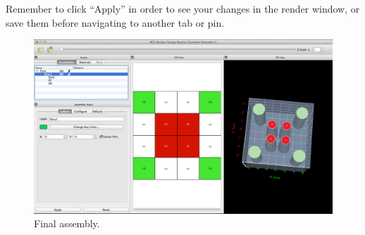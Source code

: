 Remember to click ``Apply'' in order to see your changes in the render window, or save them before navigating to another tab or pin.

\begin{figure}[htb]
\begin{center}
\includegraphics[width=0.7\linewidth]{Images/rect-final-assy1.png}
\caption{Final assembly.}
\label{fig:Rect10}
\end{center}
\end{figure}

